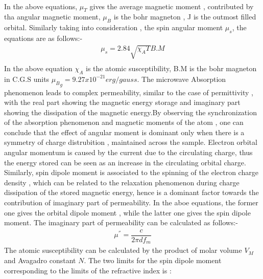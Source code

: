 \documentclass[journal]{IEEEtran}
\begin{document}
\begin{multicols}{2}
\begin{align}
\end{align}
In the above equations, ${\mu_T}$ gives the average magnetic moment , contributed by tha angular magnetic moment, ${\mu_B}$  is the bohr magneton , J is the outmost filled orbital. Similarly taking into consideration , the spin angular moment $\mu_s$, the equations are as follows:-
\begin{align}
\mu_s = 2.84 \sqrt{\chi_A T} B.M \\
\end{align}
In the above equation $\chi_A$ is the atomic susceptibility, B.M  is the bohr magneton in C.G.S units ${\mu_B}_g = 9.27 x 10^{-21} erg/gauss$. The microwave Absorption phenomenon leads to complex permeability, similar to the case of permittivity , with the real part  showing the magnetic energy storage and imaginary part showing the dissipation of the magnetic energy.By observing the  synchronization of the absorption phenomenon and magnetic moments of the atom , one can conclude that the effect of angular moment is dominant only when there is a symmetry of charge distrubition , maintained across the sample. Electron orbital angular momentum is caused by the current due to the circulating charge, thus the energy stored can be seen as an increase in the circulating orbital charge.
Similarly, spin dipole moment is associated to the spinning of the electron charge density , which can be related to the relaxation phenomenon during charge dissipation of the stored magnetic energy, hence is a dominant factor towards the contribution of imaginary part of permeability. In the aboe equations, the former one gives the orbital dipole moment , while the latter one gives the spin dipole moment.
The imaginary part of permeability can be calculated as follows:-
\begin{align}
\mu^{''} = \dfrac{c}{2 \pi d f_m}
\end{align}
The atomic susceptibility can be calculated by the product of molar volume $ V_M $ and Avagadro constant $ N $. The two limits for the spin dipole moment corresponding to the limits of the refractive index is :



\end{multicols}
\end{document}
